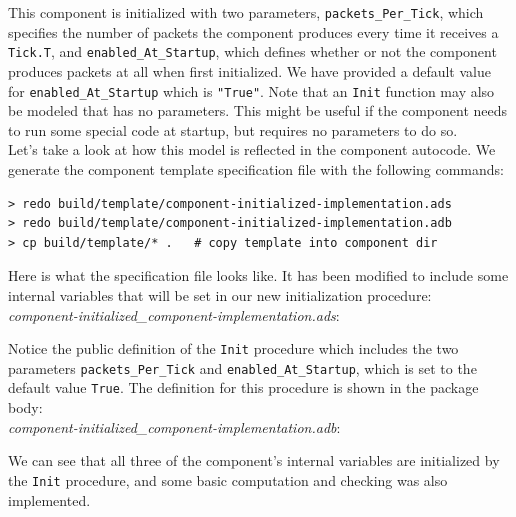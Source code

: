 This component is initialized with two parameters, \texttt{packets\_Per\_Tick}, which specifies the number of packets the component produces every time it receives a \texttt{Tick.T}, and \texttt{enabled\_At\_Startup}, which defines whether or not the component produces packets at all when first initialized. We have provided a default value for \texttt{enabled\_At\_Startup} which is \texttt{"True"}. Note that an \texttt{Init} function may also be modeled that has no parameters. This might be useful if the component needs to run some special code at startup, but requires no parameters to do so. \\

Let's take a look at how this model is reflected in the component autocode. We generate the component template specification file with the following commands:

\vspace{5mm} %
\begin{verbatim}
> redo build/template/component-initialized-implementation.ads
> redo build/template/component-initialized-implementation.adb
> cp build/template/* .   # copy template into component dir
\end{verbatim}
\vspace{5mm} %

Here is what the specification file looks like. It has been modified to include some internal variables that will be set in our new initialization procedure: \\

\textit{component-initialized\_component-implementation.ads}:

Notice the public definition of the \texttt{Init} procedure which includes the two parameters \texttt{packets\_Per\_Tick} and \texttt{enabled\_At\_Startup}, which is set to the default value \texttt{True}. The definition for this procedure is shown in the package body: \\

\textit{component-initialized\_component-implementation.adb}:

We can see that all three of the component's internal variables are initialized by the \texttt{Init} procedure, and some basic computation and checking was also implemented. \\

